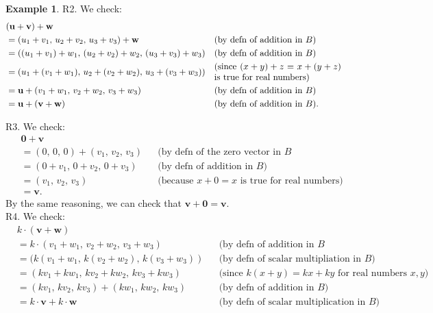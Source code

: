 \documentclass[a4paper,11pt]{book}
\theoremstyle{definition}
\newtheorem{example_environment}{Example}[chapter]
\newcommand{\ve}[1]{\mathbf{#1}}
\newenvironment{example}
	{
		\begin{oframed} 
		\begin{example_environment}
	}
	{
		\end{example_environment}
		\end{oframed}
	}
\begin{document}
\begin{example}
\noindent R2. We check:
\begin{align*}
 & (\ve{u} + \ve{v}) + \ve{w} \\
 &= ( u_1 + v_1, \, u_2 + v_2, \, u_3 + v_3) + \ve{w} && \mbox{(by defn of addition in $B$)} \\
 &= ( (u_1 + v_1) + w_1, \, (u_2 + v_2) + w_2, \, (u_3 + v_3) + w_3) && \mbox{(by defn of addition in $B$)} \\
 &= ( u_1 + (v_1 + w_1), \, u_2 + (v_2 + w_2), \, u_3 + (v_3 + w_3)) && \mbox{\begin{minipage}{5cm}(since $(x + y) + z = x + (y + z)$ is true for real numbers)\end{minipage}}  \\
 &= \ve{u} + (v_1 + w_1, \, v_2 + w_2, \, v_3 + w_3) && \mbox{(by defn of addition in $B$)} \\
 &= \ve{u} + (\ve{v} + \ve{w}) && \mbox{(by defn of addition in $B$)}.
\end{align*}

\noindent R3. We check:
\begin{align*}
 &\ve{0} + \ve{v}  \\
 &= ( 0, \, 0, \, 0) + (v_1, \, v_2, \, v_3) && \mbox{(by defn of the zero vector in $B$}\\
 &= (0 + v_1, \, 0 + v_2, \, 0 + v_3) && \mbox{(by defn of addition in $B$)} \\
 &= (v_1, \, v_2, \, v_3) && \mbox{(because $x + 0 = x$ is true for real numbers)} \\
 &= \ve{v}.
\end{align*}
By the same reasoning, we can check that $\ve{v} + \ve{0} = \ve{v}$. \\

\noindent R4. We check:
\begin{align*}
  & k \cdot ( \ve{v + w} ) \\
  &= k \cdot (v_1 + w_1, \, v_2 + w_2, \, v_3 + w_3) && \mbox{(by defn of addition in $B$} \\
  &= (k (v_1 + w_1, \, k (v_2 + w_2), \, k (v_3 + w_3) ) && \mbox{(by defn of scalar multipliation in $B$)} \\
  &= (kv_1 + kw_1, \, kv_2 + kw_2, \, kv_3 + kw_3) && \mbox{(since $k(x+y) = kx + ky$ for real numbers $x,y$)} \\
  &= (kv_1, \, kv_2, \, kv_3) + (kw_1, \, kw_2,\, kw_3) && \mbox{(by defn of addition in $B$)} \\
  &= k \cdot \ve{v} + k \cdot \ve{w} && \mbox{(by defn of scalar multiplication in $B$)} 
\end{align*} 


\end{example}
\end{document}
